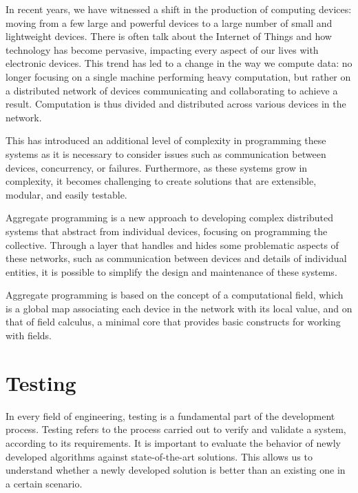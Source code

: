 \documentclass[12pt,a4paper,openright,twoside]{book}
\begin{document}
In recent years, we have witnessed a shift in the production of computing devices: moving from a few large and powerful devices to a large number of small and lightweight devices. 
There is often talk about the Internet of Things and how technology has become pervasive, impacting every aspect of our lives with electronic devices.
This trend has led to a change in the way we compute data: no longer focusing on a single machine performing heavy computation, but rather on a distributed network of devices communicating and collaborating to achieve a result. 
Computation is thus divided and distributed across various devices in the network.

This has introduced an additional level of complexity in programming these systems as it is necessary to consider issues such as communication between devices, 
concurrency, or failures. Furthermore, as these systems grow in complexity, it becomes challenging to create solutions that are extensible, modular, and easily testable. \cite{DBLP:conf/ecoop/CasadeiV16}

Aggregate programming is a new approach to developing complex distributed systems that abstract from individual devices, focusing on programming the collective. 
Through a layer that handles and hides some problematic aspects of these networks, such as communication between devices and details of individual entities, 
it is possible to simplify the design and maintenance of these systems. \cite{DBLP:journals/computer/BealPV15, DBLP:conf/sfm/BealV16}

Aggregate programming is based on the concept of a computational field, which is a global map associating each device in the network with its local value, 
and on that of field calculus, a minimal core that provides basic constructs for working with fields. \cite{DBLP:journals/corr/ViroliADPB16}

\section{Testing}

In every field of engineering, testing is a fundamental part of the development process.
Testing refers to the process carried out to verify and validate a system, according to its requirements. \cite{Spillner2011}
It is important to evaluate the behavior of newly developed algorithms against state-of-the-art solutions.
This allows us to understand whether a newly developed solution is better than an existing one in a certain scenario. \\
\end{document}

